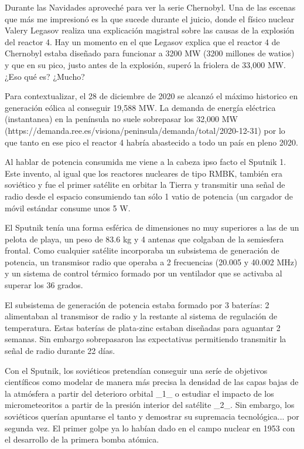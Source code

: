 Durante las Navidades aproveché para ver la serie Chernobyl. Una de las escenas que más me impresionó es la que sucede durante el juicio, donde el físico nuclear Valery Legasov realiza una explicación magistral sobre las causas de la explosión del reactor 4. Hay un momento en el que Legasov explica que el reactor 4 de Chernobyl estaba diseñado para funcionar a 3200 MW (3200 millones de watios) y que en su pico, justo antes de la explosión, superó la friolera de 33,000 MW. ¿Eso qué es? ¿Mucho? 

Para contextualizar, el 28 de diciembre de 2020 se alcanzó el máximo historico en generación eólica al conseguir 19,588 MW. La demanda de energía eléctrica (instantanea) en la península no suele sobrepasar los 32,000 MW (https://demanda.ree.es/visiona/peninsula/demanda/total/2020-12-31) por lo que tanto en ese pico el reactor 4 habría abastecido a todo un país en pleno 2020.

Al hablar de potencia consumida me viene a la cabeza ipso facto el Sputnik 1. Este invento, al igual que los reactores nucleares de tipo RMBK, también era soviético y fue el primer satélite en orbitar la Tierra y transmitir una señal de radio desde el espacio consumiendo tan sólo 1 vatio de potencia (un cargador de móvil estándar consume unos 5 W. 


El Sputnik tenía una forma esférica de dimensiones no muy superiores a las de un pelota de playa, un peso de 83.6 kg y 4 antenas que colgaban de la semiesfera frontal. Como cualquier satélite incorporaba un subsistema de generación de potencia, un transmisor radio que operaba a 2 frecuencias (20.005 y 40.002 MHz) y un sistema de control térmico formado por un ventilador que se activaba al superar los 36 grados.


El subsistema de generación de potencia estaba formado por 3 baterías: 2 alimentaban al transmisor de radio y la restante al sistema de regulación de temperatura. Estas baterías de plata-zinc estaban diseñadas para aguantar 2 semanas. Sin embargo sobrepasaron las expectativas permitiendo transmitir la señal de radio durante 22 días.

Con el Sputnik, los soviéticos pretendían conseguir una seríe de objetivos científicos como modelar de manera más precisa la densidad de las capas bajas de la atmósfera a partir del deterioro orbital _1_ o estudiar el impacto de los micrometeoritos a partir de la presión interior del satélite _2_. Sin embargo, los soviéticos querían apuntarse el tanto y demostrar su supremacia tecnológica... por segunda vez. El primer golpe ya lo habían dado en el campo nuclear en 1953 con el desarrollo de la primera bomba atómica. 

